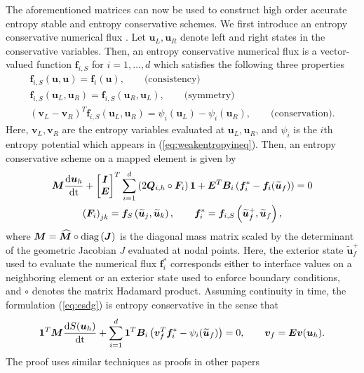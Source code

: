 \documentclass{svjour3}                     %
\renewcommand{\hat}{\widehat}
\renewcommand{\tilde}{\widetilde}
\newcommand{\diag}[1]{{\rm diag}\LRp{#1}}
\newcommand{\td}[2]{\frac{{\rm d}#1}{{\rm d}{\rm #2}}}
\newcommand{\LRp}[1]{\left( #1 \right)}
\begin{document}
The aforementioned matrices can now be used to construct high order accurate entropy stable and entropy conservative schemes.  We first introduce an entropy conservative numerical flux \cite{tadmor1987numerical}.  Let $\bm{u}_L, \bm{u}_R$ denote left and right states in the conservative variables.  Then, an entropy conservative numerical flux is a vector-valued function $\bm{f}_{i,S}$ for $i = 1,\ldots,d$ which satisfies the following three properties
\begin{gather*}
\bm{f}_{i,S}\LRp{\bm{u},\bm{u}} = \bm{f}_i(\bm{u}), \qquad \text{(consistency)}\\
\bm{f}_{i,S}\LRp{\bm{u}_L,\bm{u}_R} = \bm{f}_{i,S}(\bm{u}_R,\bm{u}_L), \qquad \text{(symmetry)}\\
\LRp{\bm{v}_L-\bm{v}_R}^T\bm{f}_{i,S}\LRp{\bm{u}_L,\bm{u}_R} = \psi_i(\bm{u}_L) - \psi_i(\bm{u}_R), \qquad \text{(conservation)}.
\end{gather*}
Here, $\bm{v}_L, \bm{v}_R$ are the entropy variables evaluated at $\bm{u}_L, \bm{u}_R$, and $\psi_i$ is the $i$th entropy potential which appears in (\ref{eq:weakentropyineq}).  
Then, an entropy conservative scheme on a mapped element is given by
\begin{gather}
{\bm{M}}\td{\bm{u}_h}{t} + \begin{bmatrix} \bm{I} \\ \bm{E} \end{bmatrix}^T
\sum_{i=1}^d \LRp{2{\bm{Q}}_{i,h} \circ \bm{F}_i}\bm{1} + \bm{E}^T{\bm{B}}_i\LRp{\bm{f}_i^*-\bm{f}_i(\tilde{\bm{u}}_f)} = 0 \label{eq:esdg}\\
\LRp{\bm{F}_i}_{jk} = \bm{f}_S\LRp{\tilde{\bm{u}}_j,\tilde{\bm{u}}_k}, \qquad \bm{f}_i^* = \bm{f}_{i,S}\LRp{\tilde{\bm{u}}_f^+,\tilde{\bm{u}}_f}, \nonumber
\end{gather}
where $\bm{M} = \hat{\bm{M}} \circ \diag{\bm{J}}$ is the diagonal mass matrix scaled by the determinant of the geometric Jacobian $J$ evaluated at nodal points.  
Here, the exterior state $\tilde{\bm{u}}_f^+$ used to evaluate the numerical flux $\bm{f}_i^*$ corresponds either to interface values on a neighboring element or an exterior state used to enforce boundary conditions, and $\circ$ denotes the matrix Hadamard product.  Assuming continuity in time, the formulation (\ref{eq:esdg}) is entropy conservative in the sense that
\[
\bm{1}^T\bm{M}\td{S(\bm{u}_h)}{t} + \sum_{i=1}^d\bm{1}^T\bm{B}_i\LRp{\bm{v}_f^T\bm{f}_i^* - \psi_i(\tilde{\bm{u}}_f)} = 0, \qquad \bm{v}_f =\bm{E}\bm{v}(\bm{u}_h).
\]
The proof uses similar techniques as proofs in other papers \cite{chen2017entropy, crean2018entropy, chan2017discretely, chan2019skew}
\end{document}
